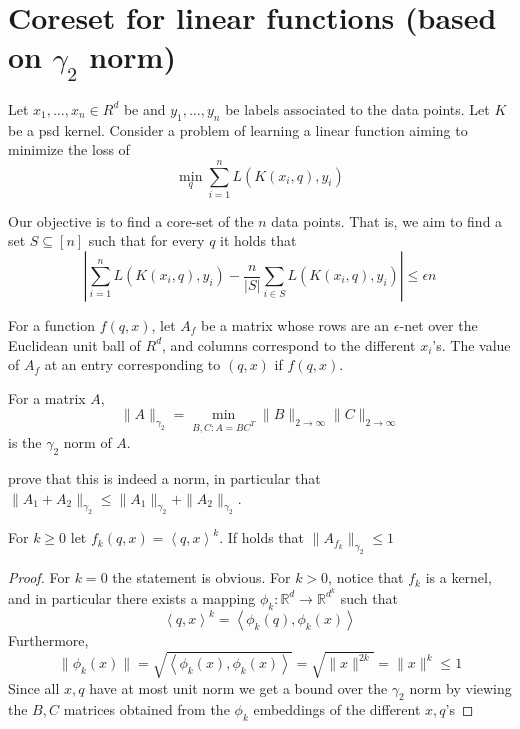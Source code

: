 \documentclass[anon,12pt]{colt2019} %
\newcommand{\ip}[1]{\left \langle #1 \right \rangle}
\newcommand{\R}{\mathbb{R}}
\newcommand{\eps}{\epsilon}
\begin{document}
%
%
%
%


\section{Coreset for linear functions (based on $\gamma_2$ norm)}

Let $x_1,\ldots,x_n \in R^d$ be and $y_1,\ldots,y_n$ be labels associated to the data points. Let $K$ be a psd kernel. Consider a problem of learning a linear function aiming to minimize the loss of 
$$\min_q \sum_{i=1}^n L(K(x_i, q), y_i)$$

Our objective is to find a core-set of the $n$ data points. That is, we aim to find a set $S \subseteq [n]$ such that for every $q$ it holds that 
$$ \left| \sum_{i=1}^n L(K(x_i, q), y_i) - \frac{n}{|S|} \sum_{i \in S} L(K(x_i, q), y_i) \right| \leq \eps n $$

For a function $f(q,x)$, let $A_f$ be a matrix whose rows are an $\eps$-net over the Euclidean unit ball of $R^d$, and columns correspond to the different $x_i$'s. The value of $A_f$ at an entry corresponding to $(q,x)$ if $f(q,x)$.

\begin{definition}
For a matrix $A$,
$$ \|A\|_{\gamma_2} = \min_{B,C: A=BC^T} \|B\|_{2 \to \infty} \|C\|_{2 \to \infty}$$
is the $\gamma_2$ norm of $A$. 
\end{definition}
 \cite{tomczak1989banach} prove that this is indeed a norm, in particular that 
 $\|A_1+A_2\|_{\gamma_2} \leq \|A_1\|_{\gamma_2} + \|A_2\|_{\gamma_2}$. 


\begin{lemma} \label{lem:powers}
For $k \geq 0$ let $f_k(q,x) = \ip{q,x}^k$. If holds that $\|A_{f_k}\|_{\gamma_2} \leq 1$
\end{lemma}
\begin{proof}
For $k=0$ the statement is obvious. For $k>0$, notice that $f_k$ is a kernel, and in particular there exists a mapping $\phi_k: \R^d \to \R^{d^k}$ such that
$$ \ip{q,x}^k = \ip{\phi_k(q), \phi_k(x)} $$
Furthermore, 
$$ \|\phi_k(x)\| = \sqrt{\ip{\phi_k(x), \phi_k(x)}} = \sqrt{\|x\|^{2k}} = \|x\|^k \leq 1 $$
Since all $x,q$ have at most unit norm we get a bound over the $\gamma_2$ norm by viewing the $B,C$ matrices obtained from the $\phi_k$ embeddings of the different $x,q$'s
\end{proof}
\end{document}
